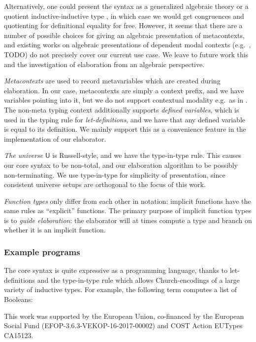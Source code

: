 \documentclass[acmsmall,review,anonymous,prologue,dvipsnames]{acmart}\settopmatter{printfolios=true,printccs=false,printacmref=false}
\newcommand{\slet}{\mathsf{let}}
\renewcommand{\U}{\mathsf{U}}
\begin{document}
Alternatively, one could present the syntax as a generalized algebraic theory
\cite{sterling2019algebraic} or a quotient inductive-inductive type
\cite{ttintt}, in which case we would get congruences and quotienting for
definitional equality for free. However, it seems that there are a number of
possible choices for giving an algebraic presentation of metacontexts, and
existing works on algebraic presentations of dependent modal contexts
(e.g.\ \cite{birkedal2018modal}, TODO) do not precisely cover our current use
case. We leave to future work this and the investigation of elaboration from an
algebraic perspective.


\emph{Metacontexts} are used to record metavariables which are created during
elaboration. In our case, metacontexts are simply a context prefix, and we have
variables pointing into it, but we do not support contextual modality e.g.\ as
in \cite{nanevski2008contextual}. The non-meta typing context additionally
supports \emph{defined variables}, which is used in the typing rule for
\emph{let-definitions}, and we have that any defined variable is equal to its
definition. We mainly support this as a convenience feature in the
implementation of our elaborator.

\emph{The universe} $\U$ is Russell-style, and we have the type-in-type rule.
This causes our core syntax to be non-total, and our elaboration algorithm
to be possibly non-terminating. We use type-in-type for simplicity of
presentation, since consistent universe setups are orthogonal to the focus of
this work.

\emph{Function types} only differ from each other in notation: implicit
functions have the same rules as ``explicit'' functions. The primary purpose of
implicit function types is to \emph{guide elaboration}: the elaborator will at
times compute a type and branch on whether it is an implicit function.

\subsubsection{Example programs}

The core syntax is quite expressive as a programming language, thanks to
let-definitions and the type-in-type rule which allows Church-encodings of a
large variety of inductive types. For example, the following term computes a
list of Booleans:






\begin{acks}
  This work was supported by the European Union, co-financed by the
  European Social Fund (EFOP-3.6.3-VEKOP-16-2017-00002) and COST Action
  EUTypes CA15123.
\end{acks}



\end{document}
